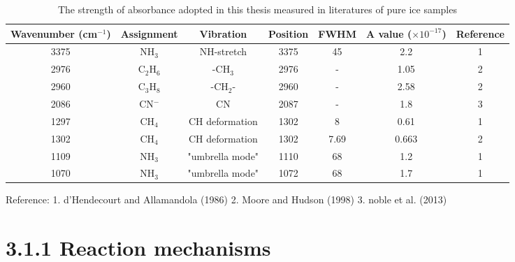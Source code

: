 \begin{table}[htbp]
\caption{The strength of absorbance adopted in this thesis measured in literatures of pure ice samples}
\label{tab:Absorbance}
\begin{tabular}{ccccccc}
\hline
\hline
Wavenumber (cm$^{-1}$) & Assignment  & Vibration & Position & FWHM & A value ($\times 10^{-17}$) & Reference \\
\hline
3375 & NH$_3$ & NH-stretch & 3375 & 45 & 2.2 & 1 \\
2976 &  C$_2$H$_6$ & -CH$_3$ & 2976 & - & 1.05 & 2 \\
2960 & C$_3$H$_8$ & -CH$_2$- & 2960 & - & 2.58 & 2 \\
2086 & CN$^-$ & CN & 2087 & - & 1.8 & 3 \\
1297 & CH$_4$ & CH deformation & 1302 & 8 & 0.61 & 1 \\
1302 & CH$_4$ & CH deformation & 1302 & 7.69 & 0.663 & 2 \\
1109 & NH$_3$ & "umbrella mode" & 1110 & 68 & 1.2 & 1 \\
1070 & NH$_3$ & "umbrella mode" & 1072 & 68 & 1.7 & 1 \\
\hline
\end{tabular}
Reference: 1. d'Hendecourt and Allamandola (1986) 2. Moore and Hudson (1998) 3. noble et al. (2013)
\end{table}

\section{3.1.1 Reaction mechanisms}

